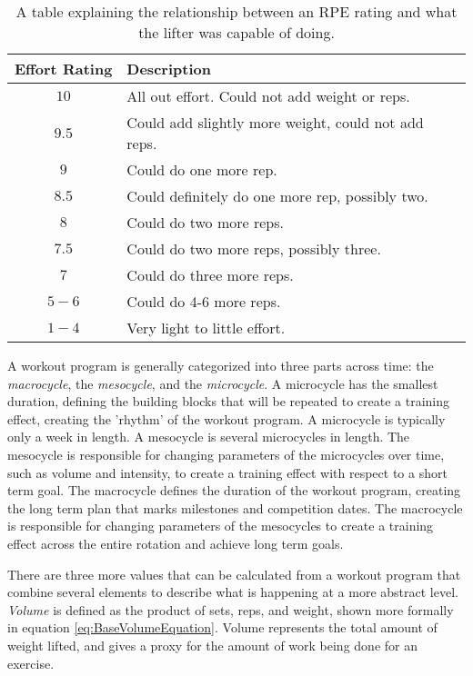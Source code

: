 \begin{table}[h]
    \centering
    \begin{tabular}{c|l}
        Effort Rating & Description \\
        \hline
        $10$ & All out effort. Could not add weight or reps. \\
        $9.5$ & Could add slightly more weight, could not add reps. \\
        $9$ & Could do one more rep. \\
        $8.5$ & Could definitely do one more rep, possibly two. \\
        $8$ & Could do two more reps. \\
        $7.5 $& Could do two more reps, possibly three. \\
        $7$ & Could do three more reps. \\
        $5-6$ & Could do 4-6 more reps. \\
        $1-4$ & Very light to little effort.
    \end{tabular}
    \caption{A table explaining the relationship between an RPE rating and what the lifter was capable of doing.}
    \label{tab:RPETable}
\end{table}

A workout program is generally categorized into three parts across time: the \textit{macrocycle}, the \textit{mesocycle}, and the \textit{microcycle}. A microcycle has the smallest duration, defining the building blocks that will be repeated to create a training effect, creating the 'rhythm' of the workout program. A microcycle is typically only a week in length. A mesocycle is several microcycles in length. The mesocycle is responsible for changing parameters of the microcycles over time, such as volume and intensity, to create a training effect with respect to a short term goal. The macrocycle defines the duration of the workout program, creating the long term plan that marks milestones and competition dates. The macrocycle is responsible for changing parameters of the mesocycles to create a training effect across the entire rotation and achieve long term goals.

There are three more values that can be calculated from a workout program that combine several elements to describe what is happening at a more abstract level. \textit{Volume} is defined as the product of sets, reps, and weight, shown more formally in equation \ref{eq:BaseVolumeEquation}. Volume represents the total amount of weight lifted, and gives a proxy for the amount of work being done for an exercise.


